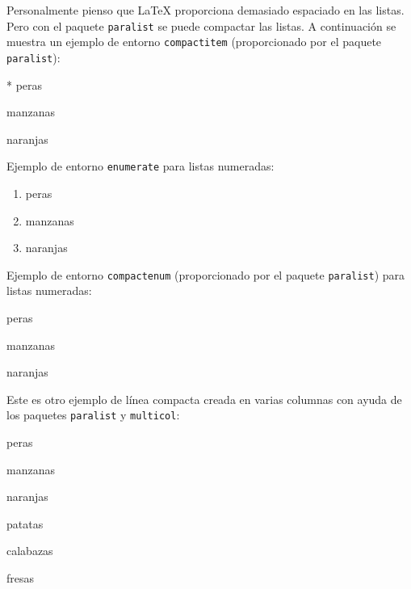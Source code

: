 \documentclass[11pt,a4paper]{article}
\begin{document}
Personalmente pienso que \LaTeX{} proporciona demasiado espaciado en las listas. Pero con el paquete \texttt{paralist} se puede compactar las listas. A continuación se muestra un ejemplo de entorno {\tt compactitem} (proporcionado por el paquete \texttt{paralist}):

\begin{compactitem}
	\item[*] peras
	\item manzanas
	\item[\ding{170}] naranjas
\end{compactitem}



\bigskip %

\noindent Ejemplo de entorno {\tt enumerate} para listas numeradas:

\begin{enumerate}
	\item peras
	\item manzanas
	\item naranjas
\end{enumerate}


\newpage

\noindent Ejemplo de entorno {\tt compactenum} (proporcionado por el paquete \texttt{paralist}) para listas numeradas:

\begin{compactenum}
	\item peras
	\item manzanas
	\item naranjas
\end{compactenum}


\bigskip

\noindent Este es otro ejemplo de línea compacta creada en varias columnas con ayuda de los paquetes \texttt{paralist} y \texttt{multicol}:
\begin{multicols}{2} %
	\begin{compactenum}
		\item peras
		\item manzanas
		\item naranjas
		\item patatas
		\item calabazas
		\item fresas
	\end{compactenum}
\end{multicols}
\end{document}
